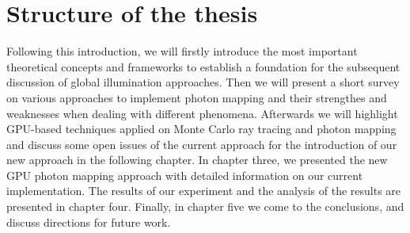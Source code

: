 \section{Structure of the thesis}

Following this introduction, we will firstly introduce the most important theoretical concepts and frameworks to establish a foundation for the subsequent discussion of global illumination approaches. Then we will present a short survey on various approaches to implement photon mapping and their strengthes and weaknesses when dealing with different phenomena. Afterwards we will highlight GPU-based techniques applied on Monte Carlo ray tracing and photon mapping and discuss some open issues of the current approach for the introduction of our new approach in the following chapter.  In chapter three, we presented the new GPU photon mapping approach with detailed information on our current implementation. The results of our experiment and the analysis of the results are presented in chapter four. Finally, in chapter five we come to the conclusions, and discuss directions for future work. 